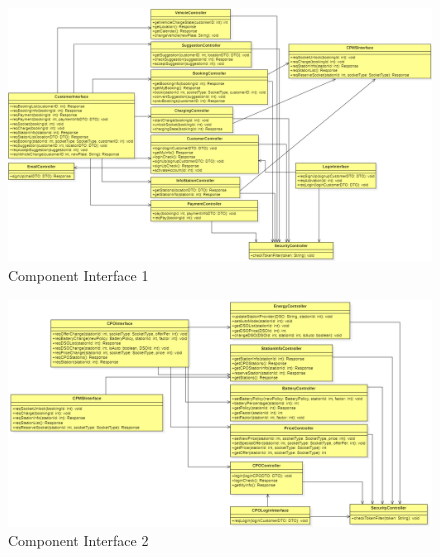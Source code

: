 \begin{figure}[H]
    \begin{center}
        \includegraphics[width=\textwidth]{img/ComponentInterface1.PNG}
        \caption{Component Interface 1}\label{component_interface1}
    \end{center}
\end{figure}

\begin{figure}[H]
    \begin{center}
        \includegraphics[width=\textwidth]{img/ComponentInterface2.PNG}
        \caption{Component Interface 2}\label{component_interface2}
    \end{center}
\end{figure}

